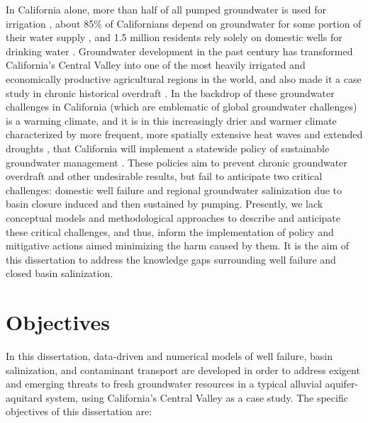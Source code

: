In California alone, more than half of all pumped groundwater is used for irrigation \citep{Faunted.2009}, about 85\% of Californians depend on groundwater for some portion of their water supply \citep{ppic2017gw}, and 1.5 million residents rely solely on domestic wells for drinking water \citep{Dieter2018}. Groundwater development in the past century has transformed California's Central Valley into one of the most heavily irrigated and economically productive agricultural regions in the world, and also made it a case study in chronic historical overdraft \citep{Hanak2011}. In the backdrop of these groundwater challenges in California (which are emblematic of global groundwater challenges) is a warming climate, and it is in this increasingly drier and warmer climate \citep{Diffenbaugh2015, Cook2015} characterized by more frequent, more spatially extensive heat waves and extended droughts \citep{Tebaldi2006, Lobell2011}, that California will implement a statewide policy of sustainable groundwater management \citep{SGMA}. These policies aim to prevent chronic groundwater overdraft and other undesirable results, but fail to anticipate two critical challenges: domestic well failure and regional groundwater salinization due to basin closure induced and then sustained by pumping. Presently, we lack conceptual models and methodological approaches to describe and anticipate these critical challenges, and thus, inform the implementation of policy and mitigative actions aimed minimizing the harm caused by them. It is the aim of this dissertation to address the knowledge gaps surrounding well failure and closed basin salinization.


\section{Objectives}

In this dissertation, data-driven and numerical models of well failure, basin salinization, and contaminant transport are developed in order to address exigent and emerging threats to fresh groundwater resources in a typical alluvial aquifer-aquitard system, using California's Central Valley as a case study. The specific objectives of this dissertation are:


